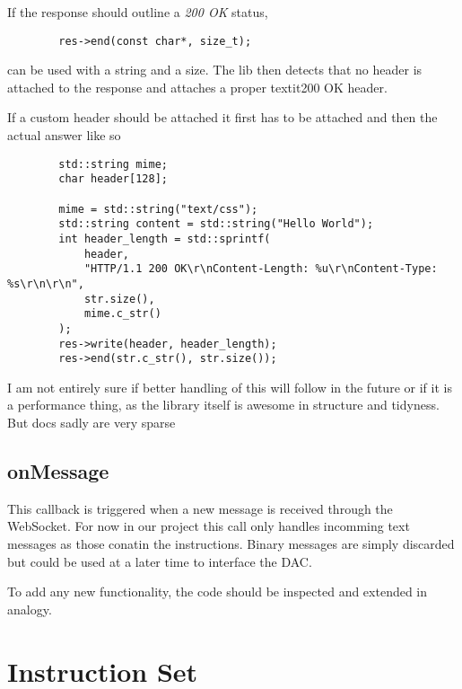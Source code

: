 If the response should outline a \textit{200 OK} status,

\begin{listing}
    \begin{verbatim}
        res->end(const char*, size_t);
    \end{verbatim}
\end{listing}

can be used with  a string and a size. The lib then detects  that no header is
attached to the response and attaches a proper textit{200 OK} header.

If a custom header should be attached it first has to be attached and then the
actual answer like so

\begin{listing}
    \begin{verbatim}
        std::string mime;
        char header[128];

        mime = std::string("text/css");
        std::string content = std::string("Hello World");
        int header_length = std::sprintf(
            header,
            "HTTP/1.1 200 OK\r\nContent-Length: %u\r\nContent-Type: %s\r\n\r\n",
            str.size(),
            mime.c_str()
        );
        res->write(header, header_length);
        res->end(str.c_str(), str.size());
    \end{verbatim}
\end{listing}

I am not entirely sure if better handling of this will follow in the future or
if it is  a performance thing, as  the library itself is  awesome in structure
and tidyness. But docs sadly are very sparse

\subsection{onMessage}

This  callback  is triggered  when  a  new  message  is received  through  the
WebSocket.
For now in our project this call only handles incomming text messages as those
conatin the instructions.
Binary messages  are simply  discarded but could  be used at  a later  time to
interface the DAC.

To add  any new functionality,  the code should  be inspected and  extended in
analogy.

\section{Instruction Set}
\label{sec:devguide:server:instruction}

